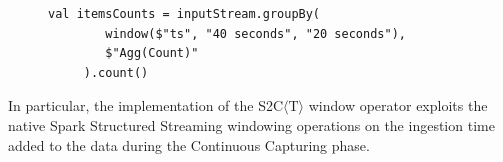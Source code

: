 \begin{figure}[ht]
\begin{minipage}{0.95\linewidth}
\begin{lstlisting}[caption={Example of Window operator in Spark.},label=lst:spark-ex,style=SPARKCODE]
   val itemsCounts = inputStream.groupBy(
        window($"ts", "40 seconds", "20 seconds"),
        $"Agg(Count)"
     ).count()
\end{lstlisting}
\end{minipage}
\end{figure}

In particular, the \sparkdi{} implementation of the S2C$\langle\mathrm{T}\rangle$ window operator exploits the native Spark Structured Streaming windowing operations on the ingestion time added to the data during the Continuous Capturing phase.

